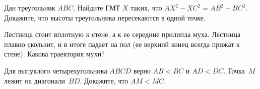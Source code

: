 \begin{problems}
\item
\sp
Дан треугольник $ABC$.
Найдите ГМТ $X$ таких, что $AX^2 - XC^2 = AB^2 - BC^2$.
\\
\sp
Докажите, что высоты треугольника пересекаются в одной точке.

\item
Лестница стоит вплотную к стене, а к ее середине прилипла муха.
Лестница плавно скользит, и в итоге падает на пол
(ее верхний конец всегда прижат к стене).
Какова траектория мухи?

\item
Для выпуклого четырехугольника $ABCD$ верно $AB < BC$ и $AD < DC$.
Точка~$M$ лежит на диагонали~$BD$.
Докажите, что $AM < MC$.

\end{problems}

